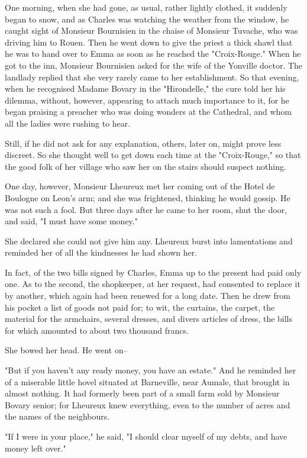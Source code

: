 \documentclass{tufte-book}
\begin{document}
One morning, when she had gone, as usual, rather lightly clothed, it
suddenly began to snow, and as Charles was watching the weather from the
window, he caught sight of Monsieur Bournisien in the chaise of Monsieur
Tuvache, who was driving him to Rouen. Then he went down to give the
priest a thick shawl that he was to hand over to Emma as soon as he
reached the "Croix-Rouge." When he got to the inn, Monsieur Bournisien
asked for the wife of the Yonville doctor. The landlady replied that
she very rarely came to her establishment. So that evening, when he
recognised Madame Bovary in the "Hirondelle," the cure told her his
dilemma, without, however, appearing to attach much importance to it,
for he began praising a preacher who was doing wonders at the Cathedral,
and whom all the ladies were rushing to hear.

Still, if he did not ask for any explanation, others, later on, might
prove less discreet. So she thought well to get down each time at the
"Croix-Rouge," so that the good folk of her village who saw her on the
stairs should suspect nothing.

One day, however, Monsieur Lheureux met her coming out of the Hotel
de Boulogne on Leon's arm; and she was frightened, thinking he would
gossip. He was not such a fool. But three days after he came to her
room, shut the door, and said, "I must have some money."

She declared she could not give him any. Lheureux burst into
lamentations and reminded her of all the kindnesses he had shown her.

In fact, of the two bills signed by Charles, Emma up to the present had
paid only one. As to the second, the shopkeeper, at her request, had
consented to replace it by another, which again had been renewed for a
long date. Then he drew from his pocket a list of goods not paid for; to
wit, the curtains, the carpet, the material for the armchairs, several
dresses, and divers articles of dress, the bills for which amounted to
about two thousand francs.

She bowed her head. He went on--

"But if you haven't any ready money, you have an estate." And he
reminded her of a miserable little hovel situated at Barneville, near
Aumale, that brought in almost nothing. It had formerly been part of a
small farm sold by Monsieur Bovary senior; for Lheureux knew everything,
even to the number of acres and the names of the neighbours.

"If I were in your place," he said, "I should clear myself of my debts,
and have money left over."
\end{document}
